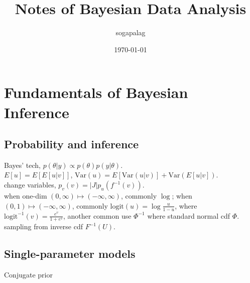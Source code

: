 \documentclass[paper=a4, fontsize=11pt]{scrartcl} %
\title{Notes of Bayesian Data Analysis}
\author{sogapalag}
\date{\normalsize\today}
\numberwithin{equation}{section} %
\numberwithin{figure}{section} %
\numberwithin{table}{section} %
\def \var {\text{Var}}
\def \logit {\text{logit}}
\begin{document}
\maketitle
\section{Fundamentals of Bayesian Inference}
\subsection{Probability and inference}
Bayes' tech, $p(\theta|y)\propto p(\theta)p(y|\theta)$.\\
$E[u]=E[E[u|v]]$,  $\var(u)=E[\var(u|v)] + \var(E[u|v])$.\\
change variables, $p_v(v) = |J|p_u(f^{-1}(v))$.\\
when one-dim $(0,\infty)\mapsto(-\infty,\infty)$, commonly $\log$; when $(0,1)\mapsto(-\infty,\infty)$, commonly $\logit(u)=\log\frac{u}{1-u}$, where $\logit^{-1}(v)=\frac{e^v}{1+e^v}$, another common use $\Phi^{-1}$ where standard normal cdf $\Phi$.\\
sampling from inverse cdf $F^{-1}(U)$.

\subsection{Single-parameter models}
Conjugate prior
\end{document}
